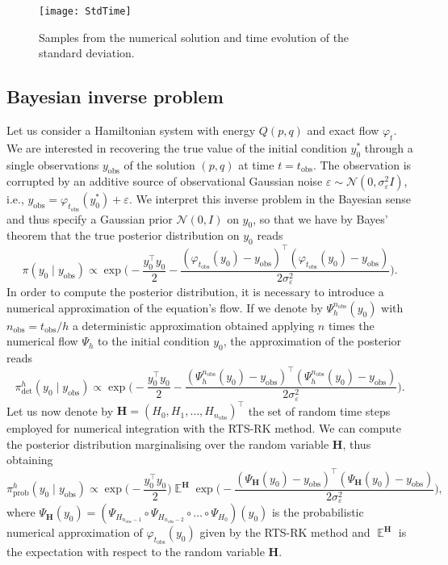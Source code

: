 \documentclass{siamart1116}
\numberwithin{theorem}{section}
\renewcommand{\phi}{\varphi}
\newcommand{\epl}{\varepsilon}
\newcommand{\E}{\operatorname{\mathbb{E}}}
\begin{document}
\begin{figure}[t]
	\centering
	\texttt{[image: StdTime]}
	\caption{Samples from the numerical solution and time evolution of the standard deviation.}
	\label{fig:StdTime}	
\end{figure}

\subsection{Bayesian inverse problem} Let us consider a Hamiltonian system with energy $Q(p,q)$ and exact flow $\phi_t$. We are interested in recovering the true value of the initial condition $y_0^*$ through a single observations $y_{\mathrm{obs}}$ of the solution $(p, q)$ at time $t = t_{\mathrm{obs}}$. The observation is corrupted by an additive source of observational Gaussian noise $\epl \sim \mathcal{N}(0, \sigma_\epl^2 I)$, i.e., $y_{\mathrm{obs}} = \phi_{t_{\mathrm{obs}}}(y_0^*) + \epl$. We interpret this inverse problem in the Bayesian sense and thus specify a Gaussian prior $\mathcal{N}(0, I)$ on $y_0$, so that we have by Bayes' theorem that the true posterior distribution on $y_0$ reads
\begin{equation}
	\pi(y_0 \mid y_{\mathrm{obs}}) \propto \exp\Big(-\frac{y_0^\top y_0}{2} -\frac{(\phi_{t_{\mathrm{obs}}}(y_0) - y_{\mathrm{obs}})^\top(\phi_{t_{\mathrm{obs}}}(y_0) - y_{\mathrm{obs}})}{2\sigma_\epl^2}\Big).
\end{equation}
In order to compute the posterior distribution, it is necessary to introduce a numerical approximation of the equation's flow. If we denote by $\Psi_h^{n_{\mathrm{obs}}}(y_0)$ with $n_{\mathrm{obs}} = t_{\mathrm{obs}} / h$ a deterministic approximation obtained applying $n$ times the numerical flow $\Psi_h$ to the initial condition $y_0$, the approximation of the posterior reads
\begin{equation}
	\pi^h_{\mathrm{det}}(y_0 \mid y_{\mathrm{obs}}) \propto \exp\Big(-\frac{y_0^\top y_0}{2} -\frac{(\Psi_h^{n_{\mathrm{obs}}}(y_0) - y_{\mathrm{obs}})^\top(\Psi_h^{n_{\mathrm{obs}}}(y_0) - y_{\mathrm{obs}})}{2\sigma_\epl^2}\Big).
\end{equation}
Let us now denote by $\mathbf{H} = (H_0, H_1, \ldots, H_{n_\mathrm{obs}})^\top$ the set of random time steps employed for numerical integration with the RTS-RK method. We can compute the posterior distribution marginalising over the random variable $\mathbf{H}$, thus obtaining
\begin{equation}
	\pi^h_{\mathrm{prob}}(y_0 \mid y_{\mathrm{obs}}) \propto \exp\Big(-\frac{y_0^\top y_0}{2}\Big) \E^{\mathbf{H}} \exp\Big(-\frac{(\Psi_\mathbf{H}(y_0) - y_{\mathrm{obs}})^\top(\Psi_\mathbf{H}(y_0) - y_{\mathrm{obs}})}{2\sigma_\epl^2}\Big),
\end{equation}
where $\Psi_\mathbf H(y_0) = (\Psi_{H_{n_{\mathrm{obs}}-1}} \circ \Psi_{H_{n_{\mathrm{obs}}-2}} \circ \ldots \circ \Psi_{H_0})(y_0)$ is the probabilistic numerical approximation of $\phi_{t_{\mathrm{obs}}}(y_0)$ given by the RTS-RK method and $\E^\mathbf{H}$ is the expectation with respect to the random variable $\mathbf{H}$.
\end{document}
